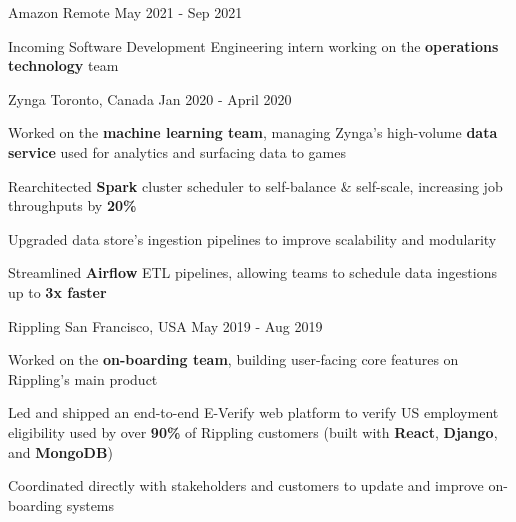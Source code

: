 \documentclass[11pt, a4paper]{awesome-cv}
\begin{document}
\makecvheader





\begin{siderules1}
\begin{cventries}
    \cventry
    {\textit{}}
    {Amazon}
    {Remote}
    {May 2021 - Sep 2021}
    {
      \begin{cvitems}
        \item {Incoming Software Development Engineering intern working on the \textbf{operations technology} team}
      \end{cvitems}
    }
    \cventry
    {\textit{}}
    {Zynga}
    {Toronto, Canada}
    {Jan 2020 - April 2020}
    {
      \begin{cvitems}
        \item {Worked on the \textbf{machine learning team}, managing Zynga's high-volume \textbf{data service} used for analytics and surfacing data to games}
        \item {Rearchitected \textbf{Spark} cluster scheduler to self-balance \& self-scale, increasing job throughputs by \textbf{20\%}}
        \item {Upgraded data store’s ingestion pipelines to improve scalability and modularity}
        \item {Streamlined \textbf{Airflow} ETL pipelines, allowing teams to schedule data ingestions up to \textbf{3x faster}}
      \end{cvitems}
    }
    \cventry
    {\textit{}}
    {Rippling}
    {San Francisco, USA}
    {May 2019 - Aug 2019}
    {
      \begin{cvitems}
        \item {Worked on the \textbf{on-boarding team}, building user-facing core features on Rippling’s main product}
        \item {Led and shipped an end-to-end E-Verify web platform to verify US employment eligibility used by over \textbf{90\%} of Rippling customers (built with \textbf{React}, \textbf{Django}, and \textbf{MongoDB})}
        \item {Coordinated directly with stakeholders and customers to update and improve on-boarding systems}
      \end{cvitems}
}
\end{cventries}
\end{siderules1}
\end{document}

